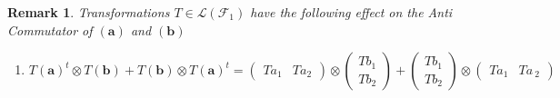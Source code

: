\documentclass[aps,preprint]{revtex4}
\newtheorem{remark}[theorem]{Remark}
\begin{document}
\begin{remark}
Transformations $T\in \mathcal{L}\left( \mathcal{F}_{1}\right) $ have the
following effect on the Anti Commutator of $\left( \boldsymbol{a}\right) $
and $\left( \boldsymbol{b}\right) $

\begin{enumerate}
\item 
\begin{equation}
T\left( \boldsymbol{a}\right) ^{t}\otimes T\left( \boldsymbol{b}\right)
+T\left( \boldsymbol{b}\right) \otimes T\left( \boldsymbol{a}\right)
^{t}=\left( 
\begin{array}{cc}
Ta_{1} & Ta_{2}%
\end{array}%
\right) \otimes \left( 
\begin{array}{c}
Tb_{1} \\ 
Tb_{2}%
\end{array}%
\right) +\left( 
\begin{array}{c}
Tb_{1} \\ 
Tb_{2}%
\end{array}%
\right) \otimes \left( 
\begin{array}{cc}
Ta_{1} & Ta_{\ 2}%
\end{array}%
\right)
\end{equation}


\end{enumerate}
\end{remark}
\end{document}
